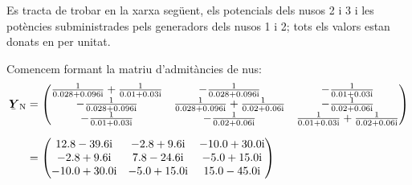 \begin{exemple}
    Es tracta de trobar en la xarxa següent, els potencials dels nusos 2
    i 3 i les potències subministrades pels generadors dels nusos 1 i 2;
    tots els valors estan donats en per unitat.
    \begin{center}
        
    \end{center}

    Comencem formant la matriu d'admitàncies de nus:
    \begin{align*}
    \mcmplx{Y}\ped{N} &= \begin{pmatrix}
    \frac{1}{\complexnum{0,028+j0,096}} + \frac{1}{\complexnum{0,01+j0,03}} & -\frac{1}{\complexnum{0,028+j0,096}}  &  -\frac{1}{\complexnum{0,01+j0,03}}\\
    -\frac{1}{\complexnum{0,028+j0,096}} & \frac{1}{\complexnum{0,028+j0,096}} + \frac{1}{\complexnum{0,02+j0,06}} &  -\frac{1}{\complexnum{0,02+j0,06}}\\
    -\frac{1}{\complexnum{0,01+j0,03}} & -\frac{1}{\complexnum{0,02+j0,06}} &
    \frac{1}{\complexnum{0,01+j0,03}} + \frac{1}{\complexnum{0,02+j0,06}}
    \end{pmatrix}  \\[1.5ex]
     &= \begin{pmatrix}
    \complexnum{12,8 - j 39,6} & \complexnum{-2,8 + j 9,6} & \complexnum{-10,0 + j 30,0} \\
    \complexnum{-2,8 + j 9,6} & \complexnum{7,8 - j 24,6} & \complexnum{-5,0 + j 15,0} \\
    \complexnum{-10,0 + j 30,0} & \complexnum{-5,0 + j 15,0} & \complexnum{15,0 - j 45,0}
    \end{pmatrix}
    \end{align*}


\end{exemple}
